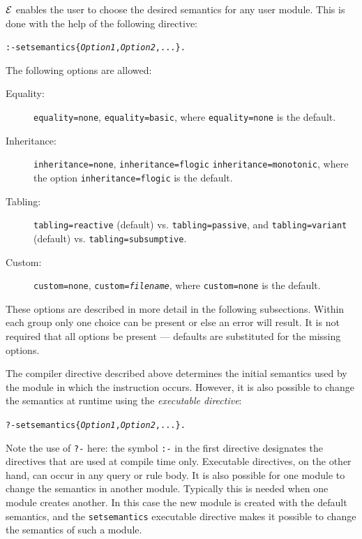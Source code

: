 \documentclass[11pt]{article}
\newcommand{\ERGO}{\mbox{\ensuremath{\cal{E}}\smaller{{\sc{RGO}}}}\xspace}
\newcommand{\FLSYSTEM}{\ERGO}
\begin{document}
\FLSYSTEM enables the user to choose the desired semantics for any user
module. This is done with the help of the following directive:
\begin{alltt}
  :- setsemantics\{\emph{Option1}, \emph{Option2}, ...\}.
\end{alltt}
The following options are allowed:
\begin{description}
  \item[Equality:]  {\tt equality=none}, {\tt equality=basic}, where
  {\tt equality=none} is the default.
\item[Inheritance:] {\tt inheritance=none}, {\tt inheritance=flogic}
  \texttt{inheritance=monotonic},  where the option
  {\tt inheritance=flogic} is the default.
\item[Tabling:] \texttt{tabling=reactive} (default) vs.
  \texttt{tabling=passive}, and \texttt{tabling=variant} (default) vs.
  \texttt{tabling=subsumptive}.
\item[Custom:] {\tt custom=none}, {\tt custom=\emph{filename}}, where
  {\tt custom=none} is the default.
\end{description}
These options are described in more detail in the following
subsections.
Within each group only one choice can be present or else an error will result.
It is not required that all options be present --- defaults are substituted
for the missing options.

The compiler directive described above determines the initial semantics used
by the module in which the instruction occurs. However, it is also possible
to change the semantics at runtime using the \emph{executable directive}:
\begin{alltt}
    ?- setsemantics\{\emph{Option1}, \emph{Option2}, ...\}.
\end{alltt}
Note the use of {\tt ?-} here: the symbol {\tt :-} in the first directive
designates the directives that are used at compile time only.  Executable
directives, on the other hand, can occur in any query or rule body.  It is
also possible for one module to change the semantics in another module.
Typically this is needed when one module creates another. In this case the
new module is created with the default semantics, and the {\tt setsemantics}
executable directive makes it possible to change the semantics of such a
module.
\end{document}
